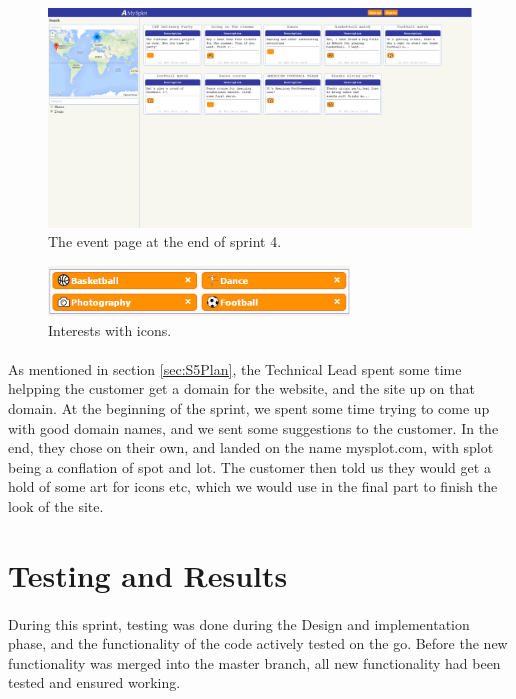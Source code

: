 \begin{figure}[ht!]
  \centering
  \includegraphics[width=\linewidth]{./img/webpage/3Nov/FrontpageEvents}
  \caption{The event page at the end of sprint 4.}
  \label{fig:S5DesignImplFrontEvents3Nov}
\end{figure}

\begin{figure}[ht!]
  \centering
  \includegraphics[width=80mm]{./Sprint5/img/InterestIcons}
  \caption{Interests with icons.}
  \label{fig:S5DesignImplInterestIcons}
\end{figure}

\paragraph{} As mentioned in section \ref{sec:S5Plan}, the Technical Lead spent some time helpping the customer get a domain for the website, and the site up on that domain. At the beginning of the sprint, we spent some time trying to come up with good domain names, and we sent some suggestions to the customer. In the end, they chose on their own, and landed on the name mysplot.com, with splot being a conflation of spot and lot. The customer then told us they would get a hold of some art for icons etc, which we would use in the final part to finish the look of the site.


\section{Testing and Results}
\label{sec:S5Testing}
\paragraph{} During this sprint, testing was done during the Design and implementation phase, and the functionality of the code actively tested on the go. Before the new functionality was merged into the master branch, all new functionality had been tested and ensured working. 

